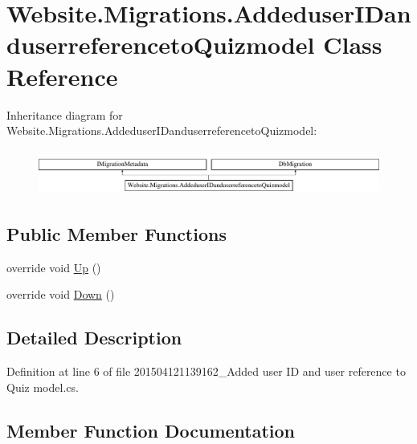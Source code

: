 \hypertarget{class_website_1_1_migrations_1_1_addeduser_i_danduserreferenceto_quizmodel}{}\section{Website.\+Migrations.\+Addeduser\+I\+Danduserreferenceto\+Quizmodel Class Reference}
\label{class_website_1_1_migrations_1_1_addeduser_i_danduserreferenceto_quizmodel}
Inheritance diagram for Website.\+Migrations.\+Addeduser\+I\+Danduserreferenceto\+Quizmodel\+:\begin{figure}[H]
\begin{center}
\leavevmode
\includegraphics[height=1.489362cm]{class_website_1_1_migrations_1_1_addeduser_i_danduserreferenceto_quizmodel}
\end{center}
\end{figure}
\subsection*{Public Member Functions}
\begin{DoxyCompactItemize}
\item 
override void \hyperlink{class_website_1_1_migrations_1_1_addeduser_i_danduserreferenceto_quizmodel_a217029ac2b00ded23e43b4b88fe6237c}{Up} ()
\item 
override void \hyperlink{class_website_1_1_migrations_1_1_addeduser_i_danduserreferenceto_quizmodel_a8964de69b6728c74015754a15ef061c6}{Down} ()
\end{DoxyCompactItemize}


\subsection{Detailed Description}


Definition at line 6 of file 201504121139162\+\_\+\+Added user I\+D and user reference to Quiz model.\+cs.



\subsection{Member Function Documentation}
\hypertarget{class_website_1_1_migrations_1_1_addeduser_i_danduserreferenceto_quizmodel_a8964de69b6728c74015754a15ef061c6}{}
